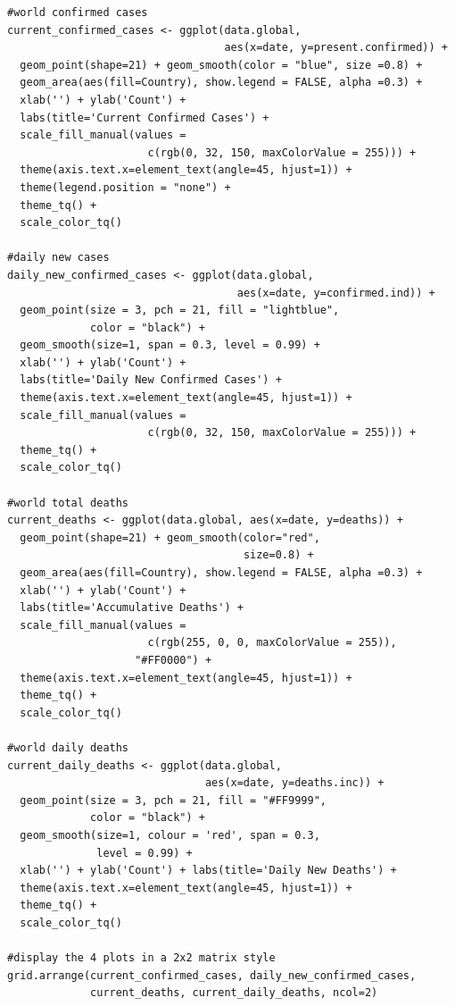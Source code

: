 \begin{verbatim}
#world confirmed cases
current_confirmed_cases <- ggplot(data.global, 
                                  aes(x=date, y=present.confirmed)) +
  geom_point(shape=21) + geom_smooth(color = "blue", size =0.8) +
  geom_area(aes(fill=Country), show.legend = FALSE, alpha =0.3) +
  xlab('') + ylab('Count') + 
  labs(title='Current Confirmed Cases') +
  scale_fill_manual(values = 
                      c(rgb(0, 32, 150, maxColorValue = 255))) +
  theme(axis.text.x=element_text(angle=45, hjust=1)) +
  theme(legend.position = "none") +
  theme_tq() +
  scale_color_tq()

#daily new cases
daily_new_confirmed_cases <- ggplot(data.global, 
                                    aes(x=date, y=confirmed.ind)) +
  geom_point(size = 3, pch = 21, fill = "lightblue",
             color = "black") + 
  geom_smooth(size=1, span = 0.3, level = 0.99) +
  xlab('') + ylab('Count') + 
  labs(title='Daily New Confirmed Cases') +
  theme(axis.text.x=element_text(angle=45, hjust=1)) +
  scale_fill_manual(values = 
                      c(rgb(0, 32, 150, maxColorValue = 255))) +
  theme_tq() +
  scale_color_tq()
  
#world total deaths
current_deaths <- ggplot(data.global, aes(x=date, y=deaths)) +
  geom_point(shape=21) + geom_smooth(color="red", 
                                     size=0.8) +
  geom_area(aes(fill=Country), show.legend = FALSE, alpha =0.3) +
  xlab('') + ylab('Count') + 
  labs(title='Accumulative Deaths') +
  scale_fill_manual(values = 
                      c(rgb(255, 0, 0, maxColorValue = 255)), 
                    "#FF0000") +
  theme(axis.text.x=element_text(angle=45, hjust=1)) +
  theme_tq() +
  scale_color_tq()

#world daily deaths
current_daily_deaths <- ggplot(data.global, 
                               aes(x=date, y=deaths.inc)) +
  geom_point(size = 3, pch = 21, fill = "#FF9999",
             color = "black") + 
  geom_smooth(size=1, colour = 'red', span = 0.3,
              level = 0.99) +
  xlab('') + ylab('Count') + labs(title='Daily New Deaths') +
  theme(axis.text.x=element_text(angle=45, hjust=1)) +
  theme_tq() +
  scale_color_tq()

#display the 4 plots in a 2x2 matrix style
grid.arrange(current_confirmed_cases, daily_new_confirmed_cases,
             current_deaths, current_daily_deaths, ncol=2)
\end{verbatim}

